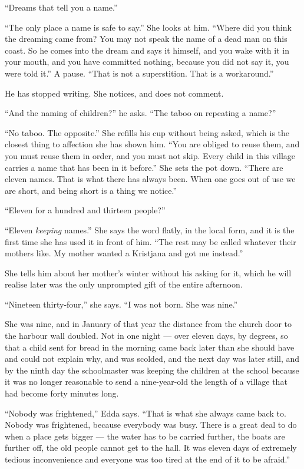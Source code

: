 \documentclass[11pt,oneside]{book}
\newcommand{\sceneline}{%
  \par\vspace{1.2em}
  \begin{center}
    \fontsize{11}{11}\selectfont \textbullet\quad\textbullet\quad\textbullet
  \end{center}
  \vspace{0.6em}\noindent\ignorespaces
}
\begin{document}
``Dreams that tell you a name.''

``The only place a name is safe to say.'' She looks at him. ``Where did
you think the dreaming came from? You may not speak the name of a dead
man on this coast. So he comes into the dream and says it himself, and
you wake with it in your mouth, and you have committed nothing, because
you did not say it, you were told it.'' A pause. ``That is not a
superstition. That is a workaround.''

He has stopped writing. She notices, and does not comment.

``And the naming of children?'' he asks. ``The taboo on repeating a
name?''

``No taboo. The opposite.'' She refills his cup without being asked,
which is the closest thing to affection she has shown him. ``You are
obliged to reuse them, and you must reuse them in order, and you must
not skip. Every child in this village carries a name that has been in it
before.'' She sets the pot down. ``There are eleven names. That is what
there has always been. When one goes out of use we are short, and being
short is a thing we notice.''

``Eleven for a hundred and thirteen people?''

``Eleven \emph{keeping} names.'' She says the word flatly, in the local
form, and it is the first time she has used it in front of him. ``The
rest may be called whatever their mothers like. My mother wanted a
Kristjana and got me instead.''

\sceneline

She tells him about her mother's winter without his asking for it, which
he will realise later was the only unprompted gift of the entire
afternoon.

``Nineteen thirty-four,'' she says. ``I was not born. She was nine.''

She was nine, and in January of that year the distance from the church
door to the harbour wall doubled. Not in one night --- over eleven days,
by degrees, so that a child sent for bread in the morning came back
later than she should have and could not explain why, and was scolded,
and the next day was later still, and by the ninth day the schoolmaster
was keeping the children at the school because it was no longer
reasonable to send a nine-year-old the length of a village that had
become forty minutes long.

``Nobody was frightened,'' Edda says. ``That is what she always came
back to. Nobody was frightened, because everybody was busy. There is a
great deal to do when a place gets bigger --- the water has to be
carried further, the boats are further off, the old people cannot get to
the hall. It was eleven days of extremely tedious inconvenience and
everyone was too tired at the end of it to be afraid.''
\end{document}
